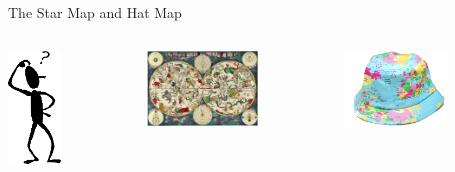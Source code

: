 \begin{frame}[fragile,label=P5Lemma]{The Star Map and Hat Map}
  \begin{columns}
    \begin{column}{0.3\textwidth}
      \hskip1cm \includegraphics[height=3cm]{inputs/amconfus.png}
    \end{column}
    \begin{column}{0.3\textwidth}
      \includegraphics[height=2cm]{inputs/starchart}
      \begin{center} \end{center}
    \end{column}
    \begin{column}{0.3\textwidth}
      \includegraphics[height=2cm]{inputs/maphat.jpg}
      \begin{center}\end{center}
    \end{column}
  \end{columns}
\end{frame}


